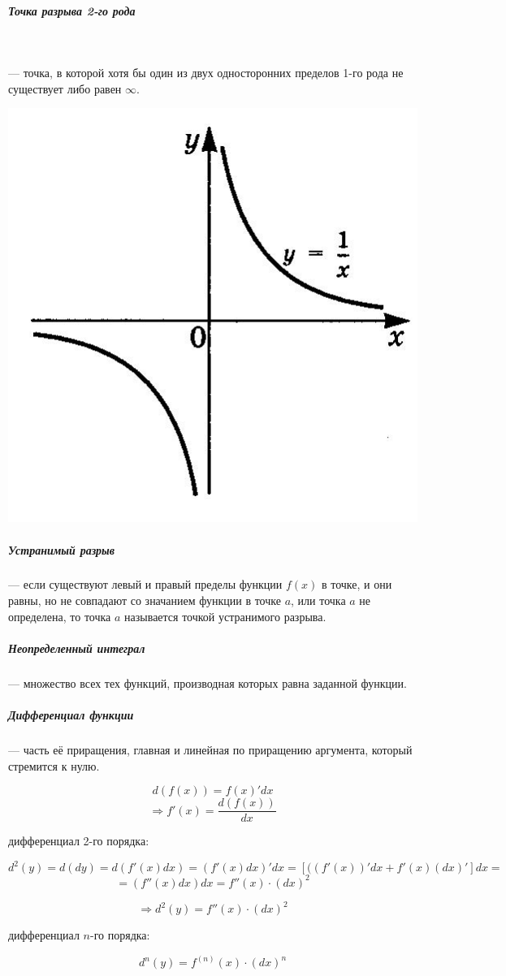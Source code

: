 \documentclass[12pt, a4]{article}
\begin{document}
\subparagraph{Точка разрыва 2-го рода} \mbox{}\\
\begin{minipage}{0.1\textwidth}
\end{minipage}
\hspace{0.5cm}
\begin{minipage}{0.6\textwidth}
	--- точка, в которой хотя бы один из двух односторонних пределов 1-го рода не существует либо равен $\infty$.
\end{minipage}
\hfill
\begin{minipage}{0.3\textwidth}
	\includegraphics[scale=0.25]{razryv_2_rod}
\end{minipage}

\subparagraph{Устранимый разрыв} --- если существуют левый и правый пределы функции $f(x)$ в точке, и они равны, но не совпадают со значанием функции в точке $a$, или точка $a$ не определена, то точка $a$ называется точкой устранимого разрыва.

\subparagraph{Неопределенный интеграл} --- множество всех тех функций, производная которых равна заданной функции.

\subparagraph{Дифференциал функции} --- часть её приращения, главная и линейная по приращению аргумента, который стремится к нулю.

\[ d(f(x)) = f(x)'dx \]
\[ \Rightarrow f'(x) = \frac{d(f(x))}{dx} \]

дифференциал 2-го порядка:

\[ d^2(y) = d(dy) = d(f'(x)dx) = (f'(x)dx)'dx = [((f'(x))'dx + f'(x)(dx)']dx = \] \[= (f''(x)dx)dx = f''(x)\cdot(dx)^2\]

\[\Rightarrow d^2(y) = f''(x)\cdot(dx)^2\]

дифференциал $n$-го порядка:

\[d^{n}(y) = f^{(n)}(x)\cdot(dx)^{n}\]
 
\end{document}
